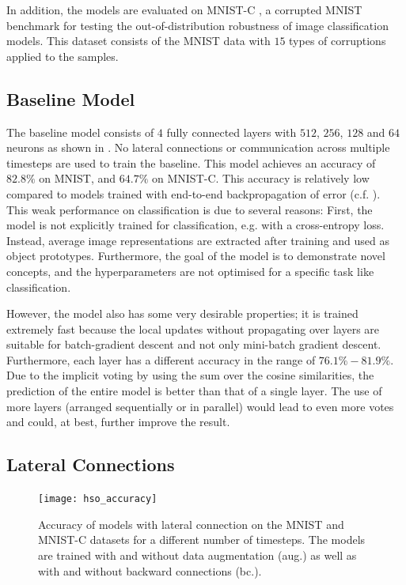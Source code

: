 In addition, the models are evaluated on MNIST-C , a corrupted MNIST benchmark for testing the out-of-distribution robustness of image classification models. This dataset consists of the MNIST data with $15$ types of corruptions applied to the samples.

\subsection{Baseline Model}
The baseline model consists of $4$ fully connected layers with $512$, $256$, $128$ and $64$ neurons as shown in .
No lateral connections or communication across multiple timesteps are used to train the baseline.
This model achieves an accuracy of $82.8\%$ on MNIST, and $64.7\%$ on MNIST-C.
This accuracy is relatively low compared to models trained with end-to-end backpropagation of error (c.f. ). 
This weak performance on classification is due to several reasons: First, the model is not explicitly trained for classification, e.g. with a cross-entropy loss. Instead, average image representations are extracted after training and used as object prototypes.
Furthermore, the goal of the model is to demonstrate novel concepts, and the hyperparameters are not optimised for a specific task like classification.

However, the model also has some very desirable properties; it is trained extremely fast because the local updates without propagating over layers are suitable for batch-gradient descent and not only mini-batch gradient descent.
Furthermore, each layer has a different accuracy in the range of $76.1\% - 81.9\%$. Due to the implicit voting by using the sum over the cosine similarities, the prediction of the entire model is better than that of a single layer.
The use of more layers (arranged sequentially or in parallel) would lead to even more votes and could, at best, further improve the result.



\subsection{Lateral Connections}
\begin{figure}[h]
    \centering
    \texttt{[image: hso\_accuracy]}
    \caption[Accuracy of models with lateral connection]{Accuracy of models with lateral connection on the MNIST and MNIST-C datasets for a different number of timesteps. The models are trained with and without data augmentation (aug.) as well as with and without backward connections (bc.).}
\end{figure}


